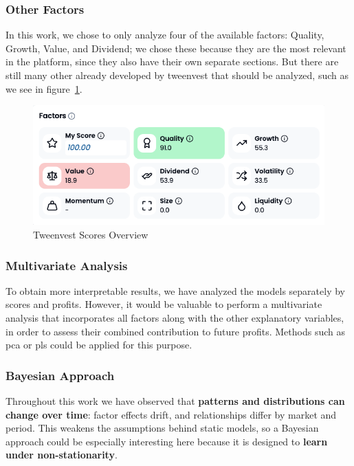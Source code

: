 \documentclass[11pt,english,a4paper,hidelinks]{book}
\begin{document}
\subsubsection{Other Factors}

\noindent In this work, we chose to only analyze four of the available factors: Quality, Growth, Value, and Dividend; we chose these because they are the most relevant in the platform, since they also have their own separate sections. But there are still many other already developed by tweenvest that should be analyzed, such as we see in figure~\ref{fig:factor_scores_overview}.

\begin{figure}[H]
    \centering
    \includegraphics[width=1\textwidth]{images/tweenvest/All of the scores.png}
    \caption{Tweenvest Scores Overview}
    \label{fig:factor_scores_overview}
\end{figure}

\subsubsection{Multivariate Analysis}

\noindent To obtain more interpretable results, we have analyzed the models separately by scores and profits. However, it would be valuable to perform a multivariate analysis that incorporates all factors along with the other explanatory variables, in order to assess their combined contribution to future profits. Methods such as \gls{pca} or \gls{pls} could be applied for this purpose.

\subsubsection{Bayesian Approach}

\noindent Throughout this work we have observed that \textbf{patterns and distributions can change over time}: factor effects drift, and relationships differ by market and period. This weakens the assumptions behind static models, so a Bayesian approach could be especially interesting here because it is designed to \textbf{learn under non-stationarity}.
\end{document}
